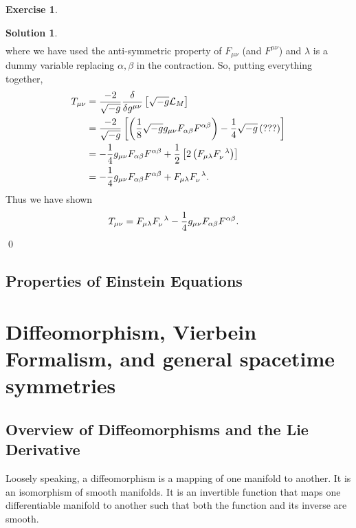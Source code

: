 \documentclass{book}
\numberwithin{equation}{section}
\theoremstyle{definition}
\newtheorem{exmp}{Exercise}[section]
\newtheorem{sln}{Solution}[section]
\newcommand{\lag}{\mathcal{L}}
\newcommand{\nn}{\nonumber}
\newcommand{\f}[2]{\frac{#1}{#2}}
\newcommand{\lp}{\left(}
\newcommand{\rp}{\right)}
\newcommand{\lb}{\left[}
\newcommand{\rb}{\right]}
\begin{document}
\begin{exmp}
\begin{sln}
\begin{align}
		\end{align}
		where we have used the anti-symmetric property of $F_{\mu\nu}$ (and $F^{\mu\nu}$) and $\lambda$ is a dummy variable replacing $\alpha, \beta$ in the contraction. So, putting everything together,
		\begin{align}
		T_{\mu\nu} &= \f{-2}{\sqrt{-g}}\f{\delta}{\delta g^{\mu\nu}} \lb \sqrt{-g}\lag_M \rb\nn\\
		&= \f{-2}{\sqrt{-g}}\lb \lp \f{1}{8}\sqrt{-g}g_{\mu\nu} F_{\alpha\beta}F^{\alpha\beta} \rp -\f{1}{4}\sqrt{-g}\lp ???  \rp\rb\nn\\
		&= -\f{1}{4}g_{\mu\nu}F_{\alpha\beta}F^{\alpha\beta} + \f{1}{2}\lb 2\lp F_{\mu\lambda} \tensor{F}{_\nu^\lambda} \rp \rb\nn\\
		&=  -\f{1}{4}g_{\mu\nu}F_{\alpha\beta}F^{\alpha\beta} + F_{\mu\lambda}\tensor{F}{_\nu^\lambda}.
		\end{align}
		Thus we have shown
		\begin{align}
		T_{\mu\nu} &= F_{\mu\lambda}\tensor{F}{_\nu^\lambda} -\f{1}{4}g_{\mu\nu}F_{\alpha\beta}F^{\alpha\beta}.
		\end{align}
		\qed \\
	\end{sln}
\end{exmp}


\section{Properties of Einstein Equations}

\newpage














\chapter{Diffeomorphism, Vierbein Formalism, and general spacetime symmetries}


\section{Overview of Diffeomorphisms and the Lie Derivative}

Loosely speaking, a diffeomorphism is a mapping of one manifold to another. It is an isomorphism of smooth manifolds. It is an invertible function that maps one differentiable manifold to another such that both the function and its inverse are smooth. \\
\end{document}
